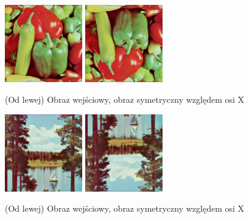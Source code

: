 \documentclass[final,a4paper,openany,12pt]{mwbk}
\begin{document}
\hfill
\\\\
\indent

\begin{figure}[H]
	\begin{center}
		\includegraphics[width=0.3\textwidth]{1/1Geo_ox_Original}
		\includegraphics[width=0.3\textwidth]{1/1Geo_ox_Result}
	\end{center}
	\caption{(Od lewej) Obraz wejściowy, obraz symetryczny względem osi X }
\end{figure}

\begin{figure}[H]
	\begin{center}
		\includegraphics[width=0.3\textwidth]{2/2Geo_ox_Original}
		\includegraphics[width=0.3\textwidth]{2/2Geo_ox_Result}
	\end{center}
	\caption{(Od lewej) Obraz wejściowy, obraz symetryczny względem osi X }
\end{figure}
\end{document}

